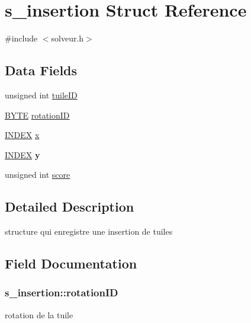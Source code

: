\hypertarget{structs__insertion}{}\section{s\+\_\+insertion Struct Reference}
\label{structs__insertion}


{\ttfamily \#include $<$solveur.\+h$>$}

\subsection*{Data Fields}
\begin{DoxyCompactItemize}
\item 
unsigned int \hyperlink{structs__insertion_a59dd0b9632c6ed17d078efefd382f58c}{tuile\+ID}
\item 
\hyperlink{types_8h_aec93e83855ac17c3c25c55c37ca186dd}{B\+Y\+TE} \hyperlink{structs__insertion_a100b29f41a276b240f539d3e25f979fa}{rotation\+ID}
\item 
\hyperlink{types_8h_ac6885dbfb371c33e523c7fb046118b36}{I\+N\+D\+EX} \hyperlink{structs__insertion_a71a3277392383e4150d923352b820255}{x}
\item 
\hyperlink{types_8h_ac6885dbfb371c33e523c7fb046118b36}{I\+N\+D\+EX} {\bfseries y}\hypertarget{structs__insertion_a4cc55504ac3335fcaa414d1349606024}{}\label{structs__insertion_a4cc55504ac3335fcaa414d1349606024}

\item 
unsigned int \hyperlink{structs__insertion_a534ff82edef3df4a52b6ee6f59fd866b}{score}
\end{DoxyCompactItemize}


\subsection{Detailed Description}
structure qui enregistre une insertion de tuiles 

\subsection{Field Documentation}
\subsubsection[{\texorpdfstring{rotation\+ID}{rotationID}}]{ s\+\_\+insertion\+::rotation\+ID}\hypertarget{structs__insertion_a100b29f41a276b240f539d3e25f979fa}{}\label{structs__insertion_a100b29f41a276b240f539d3e25f979fa}
rotation de la tuile 
